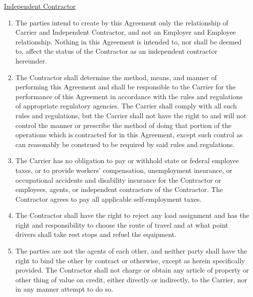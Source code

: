 \underline{Independent Contractor}
\begin{enumerate}[
    ref = \SecondLevelEnumerator
]
    \item The parties intend to create by this Agreement only the
    relationship of Carrier and Independent Contractor, and not an Employer
    and Employee relationship. Nothing in this Agreement is intended to,
    nor shall be deemed to, affect the status of the Contractor as an
    independent contractor hereunder.

    \item The Contractor shall determine the method, means, and manner of
    performing this Agreement and shall be responsible to the Carrier for
    the performance of this Agreement in accordance with the rules and
    regulations of appropriate regulatory agencies. The Carrier shall
    comply with all such rules and regulations, but the Carrier shall not
    have the right to and will not control the manner or prescribe the
    method of doing that portion of the operations which is contracted for
    in this Agreement, except such control as can reasonably be construed
    to be required by said rules and regulations.

    \item The Carrier has no obligation to pay or withhold state or federal
    employee taxes, or to provide workers' compensation, unemployment
    insurance, or occupational accidents and disability insurance for the
    Contractor or employees, agents, or independent contractors of the
    Contractor. The Contractor agrees to pay all applicable self-employment
    taxes.

    \item The Contractor shall have the right to reject any load assignment
    and has the right and responsibility to choose the route of travel and
    at what point drivers shall take rest stops and refuel the equipment.

    \item The parties are not the agents of each other, and neither party
    shall have the right to bind the other by contract or otherwise, except
    as herein specifically provided. The Contractor shall not charge or
    obtain any article of property or other thing of value on credit,
    either directly or indirectly, to the Carrier, nor in any manner
    attempt to do so.
\end{enumerate}